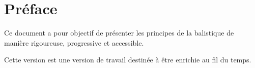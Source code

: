 \chapter*{Préface}

Ce document a pour objectif de présenter les principes de la balistique de manière rigoureuse, progressive et accessible.

Cette version est une version de travail destinée à être enrichie au fil du temps.
